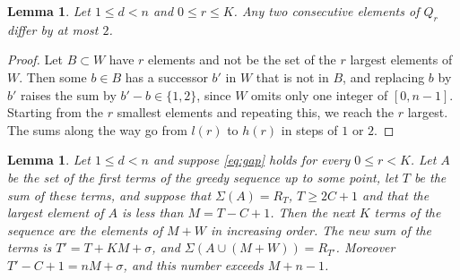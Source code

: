 \documentclass[11pt]{article}
\newtheorem{lemma}[theorem]{Lemma}
\theoremstyle{remark}
\begin{document}
\begin{lemma}\label{lem:Q}
Let $1\le d<n$ and $0\le r\le K$. Any two consecutive elements of $Q_r$ differ by at most $2$.
\end{lemma}

\begin{proof}
Let $B\subset W$ have $r$ elements and not be the set of the $r$ largest elements of $W$. Then some $b\in B$ has a
successor $b'$ in $W$ that is not in $B$, and replacing $b$ by $b'$ raises the sum by $b'-b\in\{1,2\}$, since $W$
omits only one integer of $[0,n-1]$. Starting from the $r$ smallest elements and repeating this, we reach the
$r$ largest. The sums along the way go from $l(r)$ to $h(r)$ in steps of $1$ or $2$.
\end{proof}

\begin{lemma}\label{lem:step}
Let $1\le d<n$ and suppose \eqref{eq:gap} holds for every $0\le r<K$. Let $A$ be the set of the first terms of the greedy sequence up to
some point, let $T$ be the sum of these terms, and suppose that $\Sigma(A)=R_T$, $T\ge 2C+1$ and that the largest element of $A$
is less than $M=T-C+1$. Then the next $K$ terms of the sequence are the elements of $M+W$ in increasing order. The new
sum of the terms is $T'=T+KM+\sigma$, and $\Sigma(A\cup(M+W))=R_{T'}$. Moreover $T'-C+1=nM+\sigma$, and this
number exceeds $M+n-1$.
\end{lemma}
\end{document}

